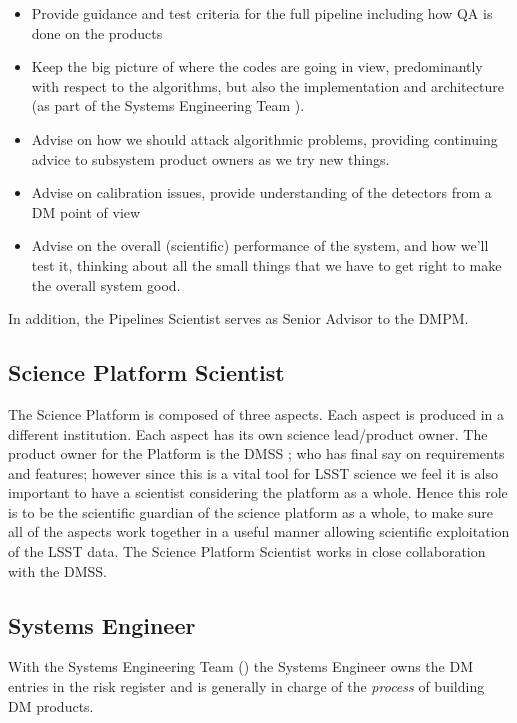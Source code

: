 \begin{itemize}

\item Provide guidance and test criteria for the full \gls{pipeline} including how \gls{QA} is done on the products
\item Keep the big picture of where the codes are going in view, predominantly with respect to the algorithms, but also the implementation and architecture (as part of the \gls{Systems Engineering} Team ).
\item Advise on how we should attack algorithmic problems, providing continuing advice to subsystem product owners as we try new things.
\item Advise on \gls{calibration} issues, provide understanding of the detectors from a \gls{DM} point of view
\item Advise on the overall (scientific) performance of the system, and how we'll test it, thinking about all the small things that we have to get right to make the overall system good.

\end{itemize}

In addition, the Pipelines Scientist serves as Senior Advisor to the \gls{DMPM}.

\subsection{Science Platform Scientist \label{role:scip}}
The Science Platform is composed of three aspects. Each aspect is produced in a different institution.
Each aspect has its own science lead/product owner.
The product owner for the Platform is the \gls{DMSS} ; who has final say on requirements and features; however since this is a vital tool for \gls{LSST} science we feel it is also important to have a scientist considering the platform as a whole.
Hence this role is to be the scientific guardian of the science platform as a whole, to make sure all of the aspects work together in a useful manner allowing scientific exploitation of the \gls{LSST} data. The \gls{Science Platform} Scientist works in close collaboration with the \gls{DMSS}.

\subsection{Systems Engineer \label{role:sysengineer}}

With the \gls{Systems Engineering} Team () the \gls{Systems Engineer} owns the \gls{DM} entries in the risk register and is generally in charge of the \textit{process} of building \gls{DM} products.

